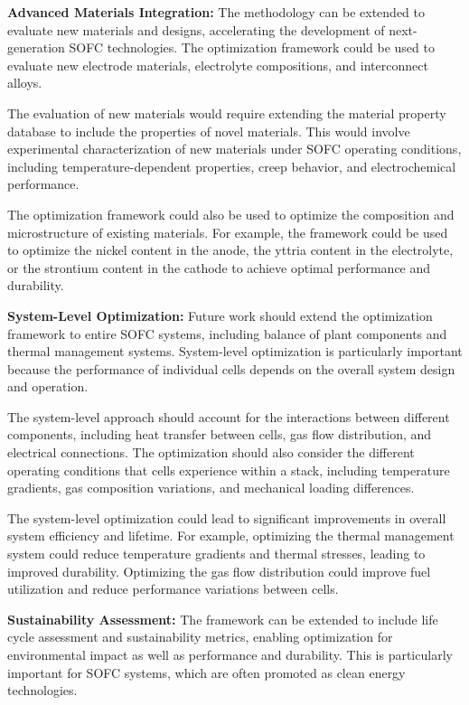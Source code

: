 \documentclass[conference]{IEEEtran}
\begin{document}
\textbf{Advanced Materials Integration:} The methodology can be extended to evaluate new materials and designs, accelerating the development of next-generation SOFC technologies. The optimization framework could be used to evaluate new electrode materials, electrolyte compositions, and interconnect alloys.

The evaluation of new materials would require extending the material property database to include the properties of novel materials. This would involve experimental characterization of new materials under SOFC operating conditions, including temperature-dependent properties, creep behavior, and electrochemical performance.

The optimization framework could also be used to optimize the composition and microstructure of existing materials. For example, the framework could be used to optimize the nickel content in the anode, the yttria content in the electrolyte, or the strontium content in the cathode to achieve optimal performance and durability.

\textbf{System-Level Optimization:} Future work should extend the optimization framework to entire SOFC systems, including balance of plant components and thermal management systems. System-level optimization is particularly important because the performance of individual cells depends on the overall system design and operation.

The system-level approach should account for the interactions between different components, including heat transfer between cells, gas flow distribution, and electrical connections. The optimization should also consider the different operating conditions that cells experience within a stack, including temperature gradients, gas composition variations, and mechanical loading differences.

The system-level optimization could lead to significant improvements in overall system efficiency and lifetime. For example, optimizing the thermal management system could reduce temperature gradients and thermal stresses, leading to improved durability. Optimizing the gas flow distribution could improve fuel utilization and reduce performance variations between cells.

\textbf{Sustainability Assessment:} The framework can be extended to include life cycle assessment and sustainability metrics, enabling optimization for environmental impact as well as performance and durability. This is particularly important for SOFC systems, which are often promoted as clean energy technologies.
\end{document}
